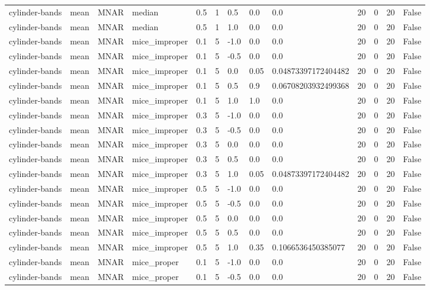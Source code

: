 \begin{tabular}{lllllllllllll}
cylinder-bands & mean & MNAR & median & 0.5 & 1 & 0.5 & 0.0 & 0.0 & 20 & 0 & 20 & False \\
cylinder-bands & mean & MNAR & median & 0.5 & 1 & 1.0 & 0.0 & 0.0 & 20 & 0 & 20 & False \\
cylinder-bands & mean & MNAR & mice\_improper & 0.1 & 5 & -1.0 & 0.0 & 0.0 & 20 & 0 & 20 & False \\
cylinder-bands & mean & MNAR & mice\_improper & 0.1 & 5 & -0.5 & 0.0 & 0.0 & 20 & 0 & 20 & False \\
cylinder-bands & mean & MNAR & mice\_improper & 0.1 & 5 & 0.0 & 0.05 & 0.04873397172404482 & 20 & 0 & 20 & False \\
cylinder-bands & mean & MNAR & mice\_improper & 0.1 & 5 & 0.5 & 0.9 & 0.06708203932499368 & 20 & 0 & 20 & False \\
cylinder-bands & mean & MNAR & mice\_improper & 0.1 & 5 & 1.0 & 1.0 & 0.0 & 20 & 0 & 20 & False \\
cylinder-bands & mean & MNAR & mice\_improper & 0.3 & 5 & -1.0 & 0.0 & 0.0 & 20 & 0 & 20 & False \\
cylinder-bands & mean & MNAR & mice\_improper & 0.3 & 5 & -0.5 & 0.0 & 0.0 & 20 & 0 & 20 & False \\
cylinder-bands & mean & MNAR & mice\_improper & 0.3 & 5 & 0.0 & 0.0 & 0.0 & 20 & 0 & 20 & False \\
cylinder-bands & mean & MNAR & mice\_improper & 0.3 & 5 & 0.5 & 0.0 & 0.0 & 20 & 0 & 20 & False \\
cylinder-bands & mean & MNAR & mice\_improper & 0.3 & 5 & 1.0 & 0.05 & 0.04873397172404482 & 20 & 0 & 20 & False \\
cylinder-bands & mean & MNAR & mice\_improper & 0.5 & 5 & -1.0 & 0.0 & 0.0 & 20 & 0 & 20 & False \\
cylinder-bands & mean & MNAR & mice\_improper & 0.5 & 5 & -0.5 & 0.0 & 0.0 & 20 & 0 & 20 & False \\
cylinder-bands & mean & MNAR & mice\_improper & 0.5 & 5 & 0.0 & 0.0 & 0.0 & 20 & 0 & 20 & False \\
cylinder-bands & mean & MNAR & mice\_improper & 0.5 & 5 & 0.5 & 0.0 & 0.0 & 20 & 0 & 20 & False \\
cylinder-bands & mean & MNAR & mice\_improper & 0.5 & 5 & 1.0 & 0.35 & 0.1066536450385077 & 20 & 0 & 20 & False \\
cylinder-bands & mean & MNAR & mice\_proper & 0.1 & 5 & -1.0 & 0.0 & 0.0 & 20 & 0 & 20 & False \\
cylinder-bands & mean & MNAR & mice\_proper & 0.1 & 5 & -0.5 & 0.0 & 0.0 & 20 & 0 & 20 & False \\

\end{tabular}
